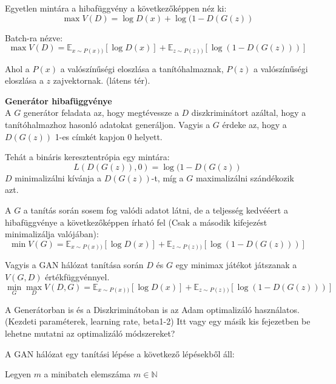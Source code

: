 Egyetlen mintára a hibafüggvény a következőképpen néz ki:
$$\max V(D) = \log D(x) + \log(1 - D(G(z))$$

Batch-ra nézve:
$$\max V(D) = \mathbb{E}_{x \sim P(x))} \left[\log D(x) \right] + \mathbb{E}_{z \sim P(z))} \left[\log(1 - D(G(z))) \right]$$

Ahol a $P(x)$ a valószínűségi eloszlása a tanítóhalmaznak, $P(z)$ a valószínűségi eloszlása a $z$ zajvektornak. (látens tér).

\noindent \textbf{Generátor hibafüggvénye}\\
A $G$ generátor feladata az, hogy megtévessze a $D$ diszkriminátort azáltal, hogy a tanítóhalmazhoz hasonló adatokat generáljon.
Vagyis a $G$ érdeke az, hogy a $D(G(z))$ 1-es címkét kapjon 0 helyett.

Tehát a bináris keresztentrópia egy mintára:
$$L(D(G(z)), 0) = \log(1 - D(G(z))$$
$D$ minimalizálni kívánja a $D(G(z))$-t, míg a $G$ maximalizálni szándékozik azt.

A $G$ a tanítás során sosem fog valódi adatot látni, de a teljesség kedvééert a hibafüggvénye a következőképpen írható fel (Csak a második kifejezést minimalizálja valójában):
$$\min V(G) = \mathbb{E}_{x \sim P(x))} \left[\log D(x) \right] + \mathbb{E}_{z \sim P(z))} \left[\log(1 - D(G(z))) \right]$$

Vagyis a GAN hálózat tanítása során $D$ és $G$ egy minimax játékot játszanak a $V(G, D)$ értékfüggvénnyel.
$$\min_{G}\max_{D}V(D, G) =  \mathbb{E}_{x \sim P(x))} \left[\log D(x) \right] + \mathbb{E}_{z \sim P(z))} \left[\log(1 - D(G(z))) \right]$$

A Generátorban is és a Diszkriminátoban is az Adam optimalizáló használatos. (Kezdeti paraméterek, learning rate, beta1-2)
Itt vagy egy másik kis fejezetben be lehetne mutatni az optimalizáló módszereket?


A GAN hálózat egy tanítási lépése a következő lépésekből áll:

Legyen $m$ a minibatch elemszáma $m \in \mathbb{N}$

